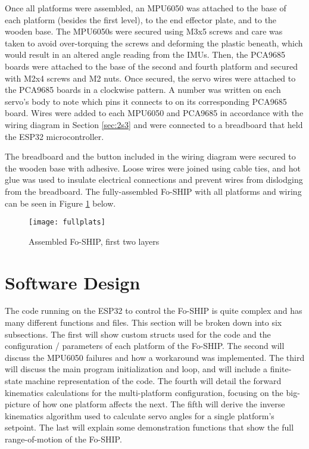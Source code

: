 \documentclass[12pt,a4paper]{report}
\begin{document}
Once all platforms were assembled, an MPU6050 was attached to the base of each platform (besides the first level), to the end effector plate, and to the wooden base. The MPU6050s were secured using M3x5 screws and care was taken to avoid over-torquing the screws and deforming the plastic beneath, which would result in an altered angle reading from the IMUs. Then, the PCA9685 boards were attached to the base of the second and fourth platform and secured with M2x4 screws and M2 nuts. Once secured, the servo wires were attached to the PCA9685 boards in a clockwise pattern. A number was written on each servo’s body to note which pins it connects to on its corresponding PCA9685 board. Wires were added to each MPU6050 and PCA9685 in accordance with the wiring diagram in Section \ref{sec:2s3} and were connected to a breadboard that held the ESP32 microcontroller. 

The breadboard and the button included in the wiring diagram were secured to the wooden base with adhesive. Loose wires were joined using cable ties, and hot glue was used to insulate electrical connections and prevent wires from dislodging from the breadboard. The fully-assembled Fo-SHIP with all platforms and wiring can be seen in Figure \ref{fig:fullplats} below.

\begin{figure}[htbp]
	\centering
	\texttt{[image: fullplats]}
	\caption{Assembled Fo-SHIP, first two layers}
	\label{fig:fullplats}
\end{figure}

\vspace{10pt}
\section{Software Design} \label{sec:2s5}
The code running on the ESP32 to control the Fo-SHIP is quite complex and has many different functions and files. This section will be broken down into six subsections. The first will show custom structs used for the code and the configuration / parameters of each platform of the Fo-SHIP. The second will discuss the MPU6050 failures and how a workaround was implemented. The third will discuss the main program initialization and loop, and will include a finite-state machine representation of the code. The fourth will detail the forward kinematics calculations for the multi-platform configuration, focusing on the big-picture of how one platform affects the next. The fifth will derive the inverse kinematics algorithm used to calculate servo angles for a single platform’s setpoint. The last will explain some demonstration functions that show the full range-of-motion of the Fo-SHIP.
\end{document}
